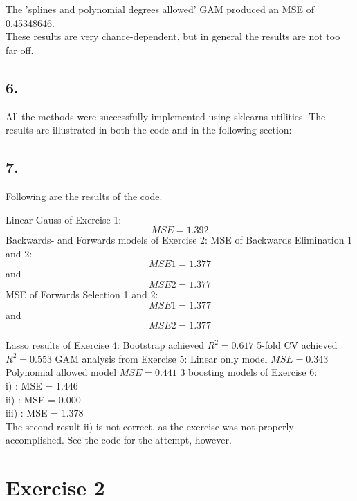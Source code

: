 \documentclass[]{article}
\begin{document}
The 'splines and polynomial degrees allowed' GAM produced an MSE of 0.45348646.\\

These results are very chance-dependent, but in general the results are not too far off.

\subsection*{6.}
All the methods were successfully implemented using sklearns utilities. The results are illustrated in both the code and in the following section:

\subsection*{7.}
Following are the results of the code.


Linear Gauss of Exercise 1:
$$
MSE = 1.392
$$
Backwards- and Forwards models of Exercise 2:
MSE of Backwards Elimination 1 and 2:
$$
MSE1 = 1.377 
$$
and 
$$
MSE2 = 1.377
$$
MSE of Forwards Selection 1 and 2:
$$
MSE1 = 1.377
$$ 
and 
$$
MSE2 = 1.377
$$

Lasso results of Exercise 4:
Bootstrap achieved $R^2 = 0.617$
5-fold CV achieved $R^2 = 0.553$
GAM analysis from Exercise 5:
Linear only model $MSE = 0.343$
Polynomial allowed model $MSE = 0.441$
3 boosting models of Exercise 6:\\

i)   : MSE = 1.446\\

ii)  : MSE = 0.000\\

iii) : MSE = 1.378\\

The second result ii) is not correct, as the exercise was not properly accomplished. See the code for the attempt, however.

\section*{Exercise 2}
\end{document}
